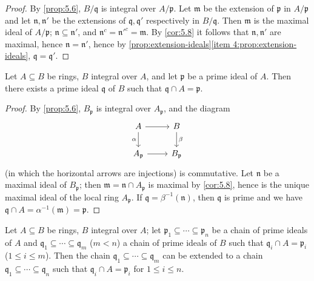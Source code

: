 \begin{proof}
    By \eqref{prop:5.6}, $B/\mathfrak{q}$ is integral over $A/\mathfrak{p}$. Let $\mathfrak{m}$ be the extension of $\mathfrak{p}$ in $A/\mathfrak{p}$ and let $\mathfrak{n}, \mathfrak{n}'$ be the extensions of $\mathfrak{q}, \mathfrak{q}'$ respectively in $B/\mathfrak{q}$. Then $\mathfrak{m}$ is the maximal ideal of $A/\mathfrak{p}$; $\mathfrak{n} \subseteq \mathfrak{n}'$, and $\mathfrak{n}^c = \mathfrak{n}'^c = \mathfrak{m}$. By \eqref{cor:5.8} it follows that $\mathfrak{n}, \mathfrak{n}'$ are maximal, hence $\mathfrak{n} = \mathfrak{n}'$, hence by \eqref{prop:extension-ideals}\eqref{item 4:prop:extension-ideals}, $\mathfrak{q} = \mathfrak{q}'$.
\end{proof}

\begin{theorem}\label{thm:5.10}
    Let $A \subseteq B$ be rings, $B$ integral over $A$, and let $\mathfrak{p}$ be a prime ideal of $A$. Then there exists a prime ideal $\mathfrak{q}$ of $B$ such that $\mathfrak{q} \cap A = \mathfrak{p}$.
\end{theorem}
\begin{proof}
    By \eqref{prop:5.6}, $B_{\mathfrak{p}}$ is integral over $A_{\mathfrak{p}}$, and the diagram
    \[\begin{tikzcd}
        A & B \\
        {A_{\mathfrak{p}}} & {B_{\mathfrak{p}}}
        \arrow[from=1-1, to=1-2]
        \arrow["\alpha"', from=1-1, to=2-1]
        \arrow["\beta", from=1-2, to=2-2]
        \arrow[from=2-1, to=2-2]
    \end{tikzcd}\]
    (in which the horizontal arrows are injections) is commutative. Let $\mathfrak{n}$ be a maximal ideal of $B_{\mathfrak{p}}$; then $\mathfrak{m} = \mathfrak{n} \cap A_{\mathfrak{p}}$ is maximal by \eqref{cor:5.8}, hence is the unique maximal ideal of the local ring $A_{\mathfrak{p}}$. If $\mathfrak{q} = \beta^{-1}(\mathfrak{n})$, then $\mathfrak{q}$ is prime and we have $\mathfrak{q} \cap A = \alpha^{-1}(\mathfrak{m}) = \mathfrak{p}$.
\end{proof}

\begin{theorem}\label{thm:5.11}
Let $A \subseteq B$ be rings, $B$ integral over $A$; let $\mathfrak{p}_1 \subseteq \cdots \subseteq \mathfrak{p}_n$ be a chain of prime ideals of $A$ and $\mathfrak{q}_1 \subseteq \cdots \subseteq \mathfrak{q}_m$ ($m < n$) a chain of prime ideals of $B$ such that $\mathfrak{q}_i \cap A = \mathfrak{p}_i$ ($1 \leq i \leq m$). Then the chain $\mathfrak{q}_1 \subseteq \cdots \subseteq \mathfrak{q}_m$ can be extended to a chain $\mathfrak{q}_1 \subseteq \cdots \subseteq \mathfrak{q}_n$ such that $\mathfrak{q}_i \cap A = \mathfrak{p}_i$ for $1 \leq i \leq n$.
\end{theorem}

